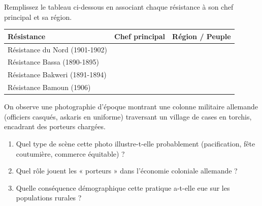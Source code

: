 \documentclass[11pt]{article}
\begin{document}
\begin{exercice}
Remplissez le tableau ci-dessous en associant chaque résistance à son chef principal et sa région.

\begin{tabular}{|p{3.5cm}|p{3.5cm}|p{3.5cm}|}
\hline
\textbf{Résistance} & \textbf{Chef principal} & \textbf{Région / Peuple} \\ \hline
Résistance du Nord (1901-1902) &  &  \\ \hline
Résistance Bassa (1890-1895) &  &  \\ \hline
Résistance Bakweri (1891-1894) &  &  \\ \hline
Résistance Bamoun (1906) &  &  \\ \hline
\end{tabular}
\end{exercice}

\begin{exercice}
On observe une photographie d'époque montrant une colonne militaire allemande (officiers casqués, askaris en uniforme) traversant un village de cases en torchis, encadrant des porteurs chargées.
\begin{enumerate}
    \item Quel type de scène cette photo illustre-t-elle probablement (pacification, fête coutumière, commerce équitable) ?
    \item Quel rôle jouent les « porteurs » dans l'économie coloniale allemande ?
    \item Quelle conséquence démographique cette pratique a-t-elle eue sur les populations rurales ?
\end{enumerate}
\end{exercice}
\end{document}
